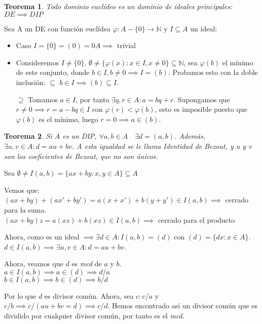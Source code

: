 \documentclass[11pt, a4paper, titlepage]{article}
\makeatletter
\newif\IfInSansMode
\let\oldsf\sffamily
\renewcommand*{\sffamily}{\oldsf\mathversion{sans}\InSansModetrue}
\let\oldnorm\normalfont
\renewcommand*{\normalfont}{\oldnorm\InSansModefalse\mathversion{normal}}
\renewenvironment{proof}[1][\proofname] {\vspace{-15pt}\par\pushQED{\qed}\normalfont\topsep6\p@\@plus6\p@\relax\trivlist\item[\hskip\labelsep\it#1\@addpunct{.}]\ignorespaces}{\popQED\endtrivlist\@endpefalse}
\renewenvironment{proof}[1][\proofname] {\par\pushQED{\qed}\normalfont\topsep6\p@\@plus6\p@\relax\trivlist\item[\hskip\labelsep\itshape\sffamily#1\@addpunct{.}]\ignorespaces}{\popQED\endtrivlist\@endpefalse}
\theoremstyle{theorem-style}
\newtheorem{nth}{Teorema}[section]
\theoremstyle{definition-style}
\theoremstyle{remark-style}
\theoremstyle{example-style}
\makeatother
\begin{document}
\begin{nth}
	Todo dominio euclídeo es un dominio de ideales principales: $DE \implies DIP$
\end{nth}
\begin{proof}
	Sea A un DE con función euclídea $\varphi: A-\{ 0 \} \longrightarrow \mathbb{N}$ y $I\subseteq A$ un ideal:
	\begin{itemize}
		\item Caso $I=\{ 0 \} = (0)= 0A \implies $ trivial
		\item Consideremos $I\neq \{ 0\}$, $\emptyset \neq \{ \varphi (x): x\in I, x\neq 0\} \subseteq \mathbb{N}$, sea $\varphi (b)$ el mínimo de este conjunto, donde $b\in I, b\neq 0 \implies I=(b)$. Probamos esto con la doble inclusión:
		  $\boxed{\subseteq}$ $b\in I \implies (b)\subseteq I$.

		$\boxed{\supseteq}$ Tomamos $a\in I$, por tanto $\exists q,r\in A: a=bq+r$. Supongamos que $r\neq 0 \implies r=a-bq\in I$ con $\varphi (r) < \varphi (b)$, esto es imposible puesto que $\varphi(b)$ es el mínimo, luego $r=0 \implies a\in (b)$.
	\end{itemize}
\end{proof}


\begin{nth}
	Si $A$ es un DIP, $\forall a,b \in A \quad \exists d = (a,b)$. Además, $\exists u,v \in A : d = au+bv$. A esta igualdad se le llama Identidad de Bezout, y u y v son los coeficientes de Bezout, que no son únicos.

\end{nth}

\begin{proof}
	Sea $\emptyset \ne I(a,b) = \{ax + by : x,y \in A\} \subseteq A$

	Vemos que:\\
$(ax+by)+(ax'+by') = a(x+x') + b(y+y') \in I(a,b) \implies$ cerrado para la suma.\\
$(ax+by)z = a(xz)+b(xz) \in I(a,b) \implies$ cerrado para el producto

Ahora, como es un ideal $\implies \exists d\in A : I(a,b) = (d)$ con $(d)=\{dx: x \in A\}$.
$d\in I(a,b) \implies \exists u,v \in A : d=au+bv$.

Ahora, veamos que $d$ es \textit{mcd} de $a$ y $b$.\\
$a\in I(a,b) \implies a \in (d) \implies d/a$\\
$b\in I(a,b) \implies b \in (d) \implies b/d$

Por lo que $d$ es divisor común. Ahora, sea $c: c/a$ y $c/b \implies c/(au+bv=d) \implies c/d$.
Hemos encontrado así un divisor común que es dividido por cualquier divisor común, por tanto es el \textit{mcd}.
\end{proof}
\end{document}
